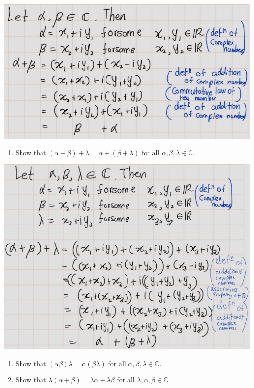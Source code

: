 \documentclass[
]{book}
\providecommand{\tightlist}{%
  \setlength{\itemsep}{0pt}\setlength{\parskip}{0pt}}
\theoremstyle{definition}
\theoremstyle{definition}
\theoremstyle{definition}
\theoremstyle{definition}
\theoremstyle{remark}
\begin{document}
\includegraphics{fig/Ex1A/Ex1.png}

\begin{enumerate}
\def\labelenumi{\arabic{enumi}.}
\setcounter{enumi}{1}
\tightlist
\item
  Show that \((\alpha + \beta) + \lambda = \alpha + (\beta + \lambda)\) for all \(\alpha, \beta, \lambda \in \mathbb{C}\).
\end{enumerate}

\includegraphics{fig/Ex1A/Ex2.png}

\begin{enumerate}
\def\labelenumi{\arabic{enumi}.}
\setcounter{enumi}{2}
\item
  Show that \((\alpha \beta)\lambda = \alpha(\beta \lambda)\) for all \(\alpha, \beta, \lambda \in \mathbb{C}\).
\item
  Show that \(\lambda(\alpha + \beta) = \lambda\alpha + \lambda\beta\) for all \(\lambda, \alpha, \beta \in \mathbb{C}\).
\end{enumerate}
\end{document}
